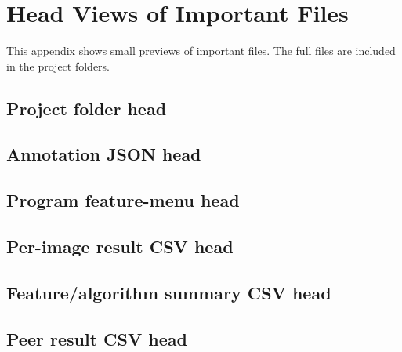 
\section{Head Views of Important Files}
This appendix shows small previews of important files. The full files are included in the project folders.

\subsection{Project folder head}


\subsection{Annotation JSON head}


\subsection{Program feature-menu head}


\subsection{Per-image result CSV head}


\subsection{Feature/algorithm summary CSV head}


\subsection{Peer result CSV head}

